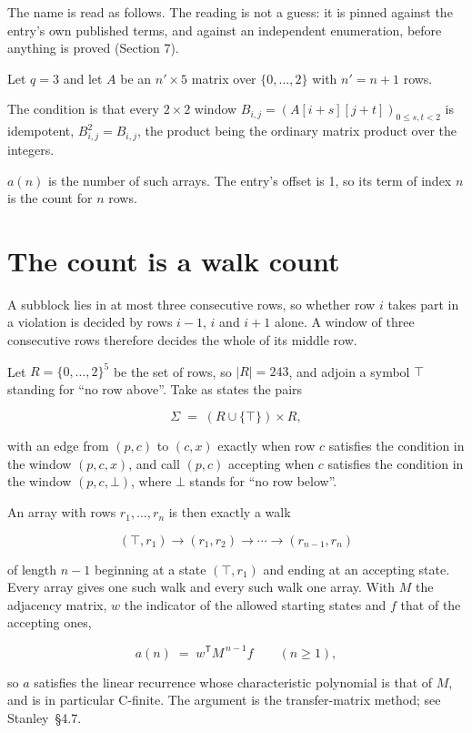 \documentclass[11pt]{article}
\theoremstyle{definition}
\begin{document}
The name is read as follows. The reading is not a guess: it is pinned against the entry's own published terms, and against an independent enumeration, before anything is proved (Section 7).

Let $q = 3$ and let $A$ be an $n' \times 5$ matrix over $\{0,\dots,2\}$ with $n' = n + 1$ rows.

The condition is that every $2 \times 2$ window $B_{i,j} = (A[i{+}s][j{+}t])_{0 \le s,t < 2}$ is idempotent, $B_{i,j}^2 = B_{i,j}$, the product being the ordinary matrix product over the integers.

$a(n)$ is the number of such arrays. The entry's offset is 1, so its term of index $n$ is the count for $n$ rows.

\section{The count is a walk count}

A subblock lies in at most three consecutive rows, so whether row $i$ takes part in a violation is decided by rows $i-1$, $i$ and $i+1$ alone. A window of three consecutive rows therefore decides the whole of its middle row.

Let $R = \{0,\dots,2\}^{5}$ be the set of rows, so $|R| = 243$, and adjoin a symbol $\top$ standing for ``no row above''. Take as states the pairs

\[\Sigma \;=\; (R \cup \{\top\}) \times R,\]

with an edge from $(p,c)$ to $(c,x)$ exactly when row $c$ satisfies the condition in the window $(p,c,x)$, and call $(p,c)$ accepting when $c$ satisfies the condition in the window $(p,c,\bot)$, where $\bot$ stands for ``no row below''.

An array with rows $r_1,\dots,r_n$ is then exactly a walk

\[(\top,r_1) \to (r_1,r_2) \to \cdots \to (r_{n-1},r_n)\]

of length $n-1$ beginning at a state $(\top,r_1)$ and ending at an accepting state. Every array gives one such walk and every such walk one array. With $M$ the adjacency matrix, $w$ the indicator of the allowed starting states and $f$ that of the accepting ones,

\[a(n) \;=\; w^{\mathsf T} M^{\,n-1} f \qquad (n \ge 1),\]

so $a$ satisfies the linear recurrence whose characteristic polynomial is that of $M$, and is in particular C-finite. The argument is the transfer-matrix method; see Stanley~\S4.7.
\end{document}
